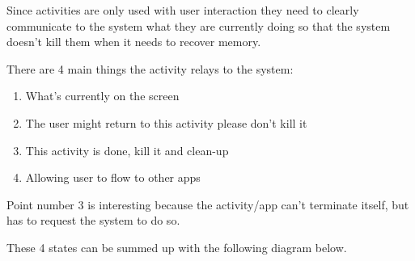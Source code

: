 \documentclass[12pt,notitlepage]{article}
\begin{document}
Since activities are only used with user interaction they need to clearly
communicate to the system what they are currently doing so that the system
doesn't kill them when it needs to recover memory.

There are 4 main things the activity relays to the system:

\begin{enumerate}
    \item What's currently on the screen
    \item The user might return to this activity please don't kill it
    \item This activity is done, kill it and clean-up
    \item Allowing user to flow to other apps
\end{enumerate}

Point number 3 is interesting because the activity/app can't terminate itself, but
has to request the system to do so.

These 4 states can be summed up with the following diagram below.
\end{document}
